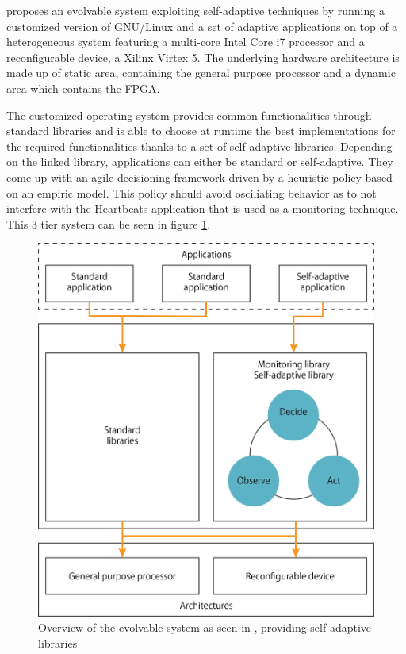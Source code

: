 \cite{evolvable} proposes an evolvable system exploiting self-adaptive techniques by running a customized version of GNU/Linux and a set of adaptive applications on top of a heterogeneous system featuring a multi-core Intel Core i7 processor and a reconfigurable device, a Xilinx Virtex 5. The underlying hardware architecture is made up of static area, containing the general purpose processor and a dynamic area which contains the FPGA. 

The customized operating system provides common functionalities through standard libraries and is able to choose at runtime the best implementations for the required functionalities thanks to a set of self-adaptive libraries. Depending on the linked library, applications can either be standard or self-adaptive. They come up with an agile decisioning framework driven by a heuristic policy based on an empiric model. This policy should avoid osciliating behavior as to not interfere with the Heartbeats application that is used as a monitoring technique. This 3 tier system can be seen in figure \ref{fig:tier}.
%
%
\begin{figure}[htb]%
\includegraphics[width=\columnwidth]{Pictures/3tier.png}%
\caption{Overview of the evolvable system as seen in \cite{evolvable}, providing self-adaptive libraries}%
\label{fig:tier}%
\end{figure}

